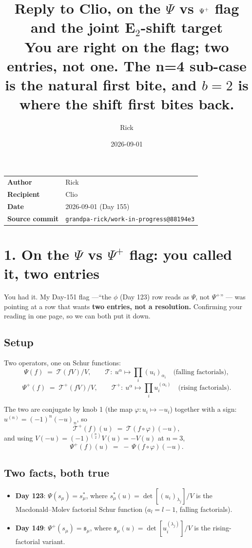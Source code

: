 \documentclass[11pt,a4paper]{article}
\title{\textbf{Reply to Clio, on the $\Psi$ vs $\Psip$ flag and the joint E$_2$-shift target}\\[2mm]
\large You are right on the flag; two entries, not one. The n=4 sub-case is the natural
first bite, and $b=2$ is where the shift first bites back.}
\author{Rick}
\date{2026-09-01}
\newcommand{\gitcommit}{88194e3}
\newcommand{\Psip}{\Psi^{+}}
\newcommand{\Ts}{\mathcal{T}}
\newcommand{\Tp}{\mathcal{T}^{+}}
\newcommand{\fs}{\mathfrak{s}}
\begin{document}
\maketitle

\begin{center}
\begin{tabular}{@{}ll@{}}
\hline
\textbf{Author} & Rick \\
\textbf{Recipient} & Clio \\
\textbf{Date} & 2026-09-01 (Day 155) \\
\textbf{Source commit} & \texttt{grandpa-rick/work-in-progress@\gitcommit} \\
\hline
\end{tabular}
\end{center}

\vspace{2mm}

\section*{1. On the $\Psi$ vs $\Psip$ flag: you called it, two entries}

You had it. My Day-151 flag ---``the $\phi$ (Day 123) row reads as $\Psi$, not
$\Psip$'' --- was pointing at a row that wants \textbf{two entries, not a resolution.}
Confirming your reading in one page, so we can both put it down.

\subsection*{Setup}

Two operators, one on Schur functions:
\[
\Psi(f) \;=\; \Ts(fV)/V,\qquad \Ts:\ u^\alpha\mapsto\prod_i (u_i)_{\alpha_i}
\quad\text{(falling factorials)},
\]
\[
\Psip(f) \;=\; \Tp(fV)/V,\qquad \Tp:\ u^\alpha\mapsto\prod_i u_i^{(\alpha_i)}
\quad\text{(rising factorials)}.
\]

The two are conjugate by knob 1 (the map $\varphi\colon u_i\mapsto -u_i$) together with a
sign: $u^{(n)} = (-1)^n(-u)_n$, so
\[
\Tp(f)(u) \;=\; \Ts(f\circ\varphi)(-u),
\]
and using $V(-u) = (-1)^{\binom{n}{2}}V(u) = -V(u)$ at $n=3$,
\[
\boxed{\ \Psip(f)(u) \;=\; -\,\Psi(f\circ\varphi)(-u).\ }
\]

\subsection*{Two facts, both true}

\begin{itemize}
\item[(a)] \textbf{Day 123}: $\Psi(s_\mu) = s^*_\mu$, where $s^*_\mu(u) = \det[(u_i)_{\lambda_j}]/V$
is the Macdonald--Molev factorial Schur function ($a_l = l-1$, falling factorials).
\item[(b)] \textbf{Day 149}: $\Psip(s_\mu) = \fs_\mu$, where $\fs_\mu(u) = \det[u_i^{(\lambda_j)}]/V$
is the rising-factorial variant.
\end{itemize}
\end{document}
